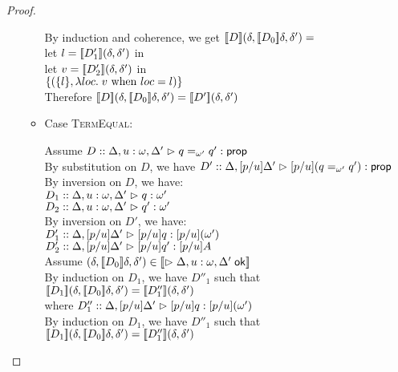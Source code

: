 \begin{proof}
\begin{enumerate}
\begin{itemize}
\begin{tabbedproof}
      \oooo By induction and coherence, we get $\interp{D}(\delta, \interp{D_0}\delta, \delta') = $ \\
      \ooooox let $l = \interp{D'_1}(\delta, \delta')$ in \\
      \ooooox let $v = \interp{D'_2}(\delta, \delta')$ in \\
      \oooooox $\setof{(\setof{l}, \semfun{loc}{v \mbox{ when }loc = l})}$ \\
      \oooo Therefore $\interp{D}(\delta, \interp{D_0}\delta, \delta') = 
                       \interp{D'}(\delta, \delta')$ \\
    \end{tabbedproof}

  \item Case \textsc{TermEqual}:
    \begin{tabbedproof}
      \oo Assume $D :: \judgeA[{\Delta, u:\omega, \Delta'}]{q =_{\omega'} q'}{\assert}$ \\
      \oo By substitution on $D$, we have $D' :: \judgeA[{\Delta, [p/u]\Delta'}]{[p/u](q =_{\omega'} q')}{\assert}$ \\
      \ooo By inversion on $D$, we have: \\
      \oooo $D_1 :: \judgeA[{\Delta, u:\omega, \Delta'}]{q}{\omega'}$ \\
      \oooo $D_2 :: \judgeA[{\Delta, u:\omega, \Delta'}]{q'}{\omega'}$ \\
      \ooo By inversion on $D'$, we have: \\
      \oooo $D'_1 :: \judgeA[{\Delta, [p/u]\Delta'}]{[p/u]q}{[p/u](\omega')}$ \\
      \oooo $D'_2 :: \judgeA[{\Delta, [p/u]\Delta'}]{[p/u]q'}{[p/u]A}$ \\
      \ooo Assume $(\delta, \interp{D_0}\delta, \delta') \in 
                     \interp{\judgeACtx{\Delta, u:\omega, \Delta'}}$ \\
      \oooo By induction on $D_1$, we have $D''_1$ such that \\
      \ooooo $\interp{D_1}(\delta, \interp{D_0}\delta, \delta') = 
              \interp{D''_1}(\delta, \delta')$ \\
      \oooo where $D''_1 :: \judgeA[{\Delta, [p/u]\Delta'}]{[p/u]q}{[p/u](\omega')}$ \\
      \oooo By induction on $D_1$, we have $D''_1$ such that \\
      \ooooo $\interp{D_1}(\delta, \interp{D_0}\delta, \delta') = 
              \interp{D''_1}(\delta, \delta')$ \\

\end{tabbedproof}
\end{itemize}
\end{enumerate}
\end{proof}
